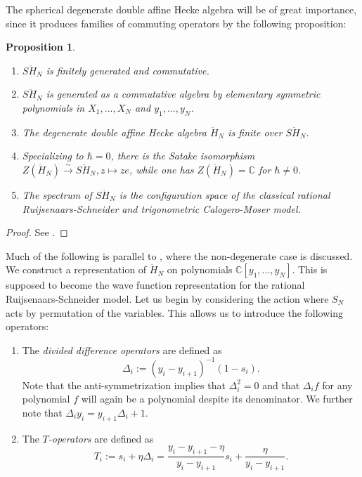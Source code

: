 \documentclass[11pt]{report}
\newtheorem{prop}[theorem]{Proposition}
\theoremstyle{definition}
\theoremstyle{remark}
\theoremstyle{remark}
\newcommand{\C}{\mathbb{C}}
\begin{document}
The spherical degenerate double affine Hecke algebra will be of great importance, since it produces families of commuting operators by the following proposition: 

\begin{prop}
\begin{enumerate}[label=(\roman*)]
\item $S\ddot H_N$ is finitely generated and commutative.
\item $S\ddot H_N$ is generated as a commutative algebra by elementary symmetric polynomials in $X_1,...,X_N$ and $y_1,...,y_N$.
\item The degenerate double affine Hecke algebra $\ddot H_N$ is finite over $S\ddot H_N$.
\item Specializing to $\hbar = 0$, there is the Satake isomorphism $Z(\ddot H_N) \overset \sim \to S\ddot H_N, z \mapsto ze$, while one has $Z(\ddot H_N) = \C$ for $\hbar \neq 0$.
\item The spectrum of $S\ddot H_N$ is the configuration space of the classical rational Ruijsenaars-Schneider and trigonometric Calogero-Moser model.
\end{enumerate}
\end{prop}

\begin{proof}
See \cite{article:oblomkov:2003}.
\end{proof}

Much of the following is parallel to \cite{article:lamers:2022}, where the non-degenerate case is discussed. We construct a representation of $\dot H_N$ on polynomials $\C[y_1,...,y_N]$. This is supposed to become the wave function representation for the rational Ruijsenaars-Schneider model. Let us begin by considering the action where $S_N$ acts by permutation of the variables. This allows us to introduce the following operators:
\begin{enumerate}[label=(\roman*)]
\item The \emph{divided difference operators} are defined as
\begin{equation*}
\Delta_i := (y_i-y_{i+1})^{-1} (1-s_i).
\end{equation*}
Note that the anti-symmetrization implies that $\Delta_i^2 = 0$ and that $\Delta_i f$ for any polynomial $f$ will again be a polynomial despite its denominator. We further note that $\Delta_i y_i = y_{i+1} \Delta_i + 1$.
\item The \emph{$T$-operators} are defined as
\begin{equation*}
T_i := s_i + \eta \Delta_i = \frac{y_i-y_{i+1}-\eta}{y_i-y_{i+1}} s_i + \frac{\eta}{y_i-y_{i+1}}.
\end{equation*}
\end{enumerate}
\end{document}
